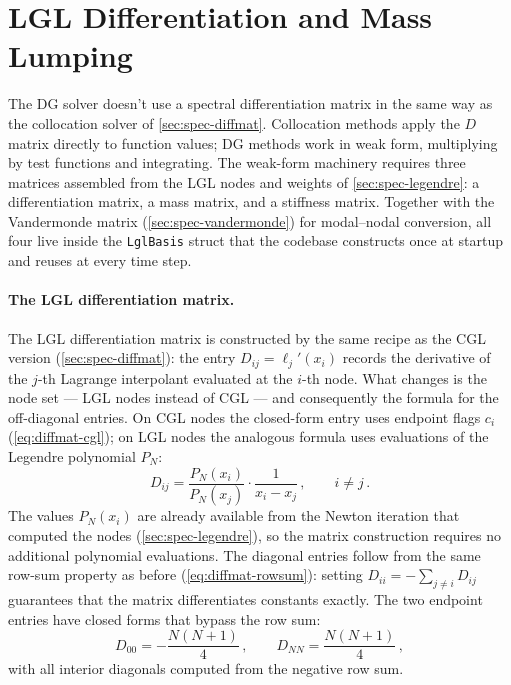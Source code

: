 \section{LGL Differentiation and Mass Lumping}
\label{sec:spec-lgl}

The DG solver doesn't use a spectral differentiation matrix in the
same way as the collocation solver of \cref{sec:spec-diffmat}.
Collocation methods apply the $D$ matrix directly to function values;
DG methods work in weak form, multiplying by test functions and
integrating.  The weak-form machinery requires three matrices
assembled from the LGL nodes and weights of
\cref{sec:spec-legendre}: a differentiation matrix, a mass matrix,
and a stiffness matrix.  Together with the Vandermonde matrix
(\cref{sec:spec-vandermonde}) for modal--nodal conversion, all four
live inside the \texttt{LglBasis} struct that the codebase constructs
once at startup and reuses at every time step.

\paragraph{The LGL differentiation matrix.}

The LGL differentiation matrix is constructed by the same recipe
as the CGL version (\cref{sec:spec-diffmat}): the entry $D_{ij} =
\ell_j'(x_i)$ records the derivative of the $j$-th Lagrange
interpolant evaluated at the $i$-th node.  What changes is the node
set --- LGL nodes instead of CGL --- and consequently the formula for
the off-diagonal entries.  On CGL nodes the closed-form entry uses
endpoint flags $c_i$ (\cref{eq:diffmat-cgl}); on LGL nodes the
analogous formula uses evaluations of the Legendre polynomial $P_N$:
%
\begin{equation}
  D_{ij} = \frac{P_N(x_i)}{P_N(x_j)}
    \cdot \frac{1}{x_i - x_j} \,,
  \qquad i \neq j \,.
  \label{eq:lgl-diffmat-offdiag}
\end{equation}
%
The values $P_N(x_i)$ are already available from the Newton iteration
that computed the nodes (\cref{sec:spec-legendre}), so the matrix
construction requires no additional polynomial evaluations.  The
diagonal entries follow from the same row-sum property as before
(\cref{eq:diffmat-rowsum}): setting $D_{ii} = -\sum_{j \neq i}
D_{ij}$ guarantees that the matrix differentiates constants exactly.
The two endpoint entries have closed forms that bypass the row sum:
%
\begin{equation}
  D_{00} = -\frac{N(N+1)}{4} \,, \qquad
  D_{NN} = \frac{N(N+1)}{4} \,,
  \label{eq:lgl-diffmat-endpoints}
\end{equation}
%
with all interior diagonals computed from the negative row sum.

